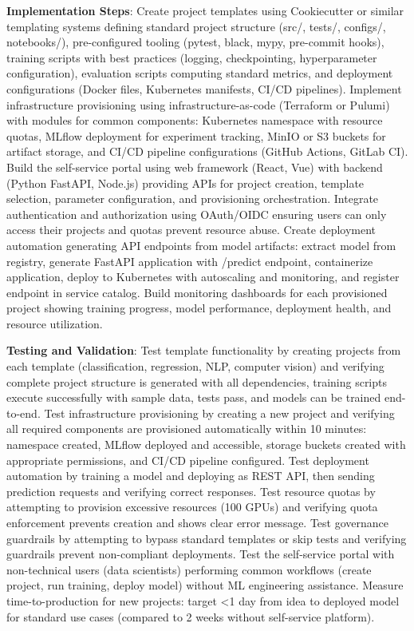 \textbf{Implementation Steps}: Create project templates using Cookiecutter or similar templating systems defining standard project structure (src/, tests/, configs/, notebooks/), pre-configured tooling (pytest, black, mypy, pre-commit hooks), training scripts with best practices (logging, checkpointing, hyperparameter configuration), evaluation scripts computing standard metrics, and deployment configurations (Docker files, Kubernetes manifests, CI/CD pipelines). Implement infrastructure provisioning using infrastructure-as-code (Terraform or Pulumi) with modules for common components: Kubernetes namespace with resource quotas, MLflow deployment for experiment tracking, MinIO or S3 buckets for artifact storage, and CI/CD pipeline configurations (GitHub Actions, GitLab CI). Build the self-service portal using web framework (React, Vue) with backend (Python FastAPI, Node.js) providing APIs for project creation, template selection, parameter configuration, and provisioning orchestration. Integrate authentication and authorization using OAuth/OIDC ensuring users can only access their projects and quotas prevent resource abuse. Create deployment automation generating API endpoints from model artifacts: extract model from registry, generate FastAPI application with /predict endpoint, containerize application, deploy to Kubernetes with autoscaling and monitoring, and register endpoint in service catalog. Build monitoring dashboards for each provisioned project showing training progress, model performance, deployment health, and resource utilization.

\textbf{Testing and Validation}: Test template functionality by creating projects from each template (classification, regression, NLP, computer vision) and verifying complete project structure is generated with all dependencies, training scripts execute successfully with sample data, tests pass, and models can be trained end-to-end. Test infrastructure provisioning by creating a new project and verifying all required components are provisioned automatically within 10 minutes: namespace created, MLflow deployed and accessible, storage buckets created with appropriate permissions, and CI/CD pipeline configured. Test deployment automation by training a model and deploying as REST API, then sending prediction requests and verifying correct responses. Test resource quotas by attempting to provision excessive resources (100 GPUs) and verifying quota enforcement prevents creation and shows clear error message. Test governance guardrails by attempting to bypass standard templates or skip tests and verifying guardrails prevent non-compliant deployments. Test the self-service portal with non-technical users (data scientists) performing common workflows (create project, run training, deploy model) without ML engineering assistance. Measure time-to-production for new projects: target <1 day from idea to deployed model for standard use cases (compared to 2 weeks without self-service platform).

